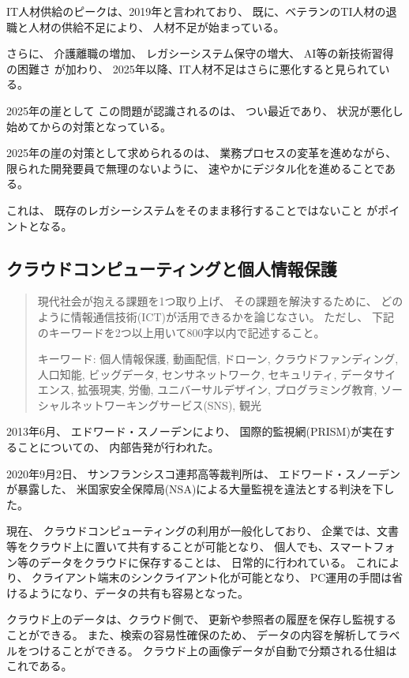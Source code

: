 \documentclass[12pt]{jsarticle}
\begin{document}
IT人材供給のピークは、2019年と言われており、
既に、ベテランのTI人材の退職と人材の供給不足により、
人材不足が始まっている。

さらに、
介護離職の増加、
レガシーシステム保守の増大、
AI等の新技術習得の困難さ
が加わり、
2025年以降、IT人材不足はさらに悪化すると見られている。

2025年の崖として
この問題が認識されるのは、
つい最近であり、
状況が悪化し始めてからの対策となっている。

2025年の崖の対策として求められるのは、
業務プロセスの変革を進めながら、
限られた開発要員で無理のないように、
速やかにデジタル化を進めることである。

これは、
既存のレガシーシステムをそのまま移行することではないこと
がポイントとなる。

\subsection{
クラウドコンピューティングと個人情報保護
}

\begin{quotation}
現代社会が抱える課題を1つ取り上げ、
その課題を解決するために、
どのように情報通信技術(ICT)が活用できるかを論じなさい。
ただし、
下記のキーワードを2つ以上用いて800字以内で記述すること。

キーワード:
個人情報保護,
動画配信,
ドローン,
クラウドファンディング,
人口知能,
ビッグデータ,
センサネットワーク,
セキュリティ,
データサイエンス,
拡張現実,
労働,
ユニバーサルデザイン,
プログラミング教育,
ソーシャルネットワーキングサービス(SNS),
観光
\end{quotation}

2013年6月、
エドワード・スノーデンにより、
国際的監視網(PRISM)が実在することについての、
内部告発が行われた。

2020年9月2日、
サンフランシスコ連邦高等裁判所は、
エドワード・スノーデンが暴露した、
米国家安全保障局(NSA)による大量監視を違法とする判決を下した。


現在、
クラウドコンピューティングの利用が一般化しており、
企業では、文書等をクラウド上に置いて共有することが可能となり、
個人でも、スマートフォン等のデータをクラウドに保存することは、
日常的に行われている。
これにより、
クライアント端末のシンクライアント化が可能となり、
PC運用の手間は省けるようになり、データの共有も容易となった。

クラウド上のデータは、クラウド側で、
更新や参照者の履歴を保存し監視することができる。
また、検索の容易性確保のため、
データの内容を解析してラベルをつけることができる。
クラウド上の画像データが自動で分類される仕組はこれである。
\end{document}
